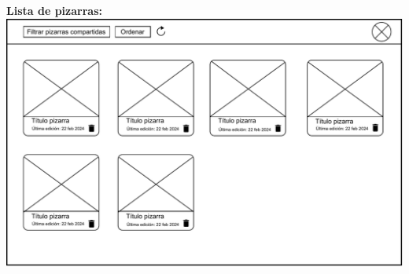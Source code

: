 \documentclass[a4paper, oneside, final]{scrartcl}
\begin{document}
\textbf{\large Lista de pizarras:}\\[3mm]
\includegraphics[width=\textwidth]{images/WireframeListaPizarras.drawio.pdf}
\end{document}
